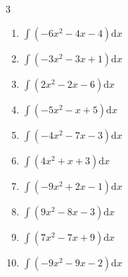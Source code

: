 \begin{multicols}{3}
\begin{enumerate}

\columnbreak %

\resetques

  \item $\displaystyle \int \left( -6x^{2}-4x-4 \right) \mathrm{d}x$


  \item $\displaystyle \int \left( -3x^{2}-3x+1 \right) \mathrm{d}x$


  \item $\displaystyle \int \left( 2x^{2}-2x-6 \right) \mathrm{d}x$


  \item $\displaystyle \int \left( -5x^{2}-x+5 \right) \mathrm{d}x$


  \item $\displaystyle \int \left( -4x^{2}-7x-3 \right) \mathrm{d}x$


  \item $\displaystyle \int \left( 4x^{2}+x+3 \right) \mathrm{d}x$


  \item $\displaystyle \int \left( -9x^{2}+2x-1 \right) \mathrm{d}x$


  \item $\displaystyle \int \left( 9x^{2}-8x-3 \right) \mathrm{d}x$


  \item $\displaystyle \int \left( 7x^{2}-7x+9 \right) \mathrm{d}x$


  \item $\displaystyle \int \left( -9x^{2}-9x-2 \right) \mathrm{d}x$


\end{enumerate}
\end{multicols}
